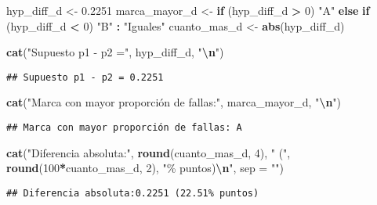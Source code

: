 \documentclass[
]{article}
\newenvironment{Shaded}{\begin{snugshade}}{\end{snugshade}}
\newcommand{\AttributeTok}[1]{\textcolor[rgb]{0.13,0.29,0.53}{#1}}
\newcommand{\ControlFlowTok}[1]{\textcolor[rgb]{0.13,0.29,0.53}{\textbf{#1}}}
\newcommand{\DecValTok}[1]{\textcolor[rgb]{0.00,0.00,0.81}{#1}}
\newcommand{\FloatTok}[1]{\textcolor[rgb]{0.00,0.00,0.81}{#1}}
\newcommand{\FunctionTok}[1]{\textcolor[rgb]{0.13,0.29,0.53}{\textbf{#1}}}
\newcommand{\NormalTok}[1]{#1}
\newcommand{\OtherTok}[1]{\textcolor[rgb]{0.56,0.35,0.01}{#1}}
\newcommand{\SpecialCharTok}[1]{\textcolor[rgb]{0.81,0.36,0.00}{\textbf{#1}}}
\newcommand{\StringTok}[1]{\textcolor[rgb]{0.31,0.60,0.02}{#1}}
\begin{document}
\begin{Shaded}
\begin{Highlighting}[]
\NormalTok{hyp\_diff\_d }\OtherTok{\textless{}{-}} \FloatTok{0.2251}
\NormalTok{marca\_mayor\_d }\OtherTok{\textless{}{-}} \ControlFlowTok{if}\NormalTok{ (hyp\_diff\_d }\SpecialCharTok{\textgreater{}} \DecValTok{0}\NormalTok{) }\StringTok{"A"} \ControlFlowTok{else} \ControlFlowTok{if}\NormalTok{ (hyp\_diff\_d }\SpecialCharTok{\textless{}} \DecValTok{0}\NormalTok{) }\StringTok{"B"} \SpecialCharTok{:} \StringTok{"Iguales"}
\NormalTok{cuanto\_mas\_d }\OtherTok{\textless{}{-}} \FunctionTok{abs}\NormalTok{(hyp\_diff\_d)}

\FunctionTok{cat}\NormalTok{(}\StringTok{"Supuesto p1 {-} p2 ="}\NormalTok{, hyp\_diff\_d, }\StringTok{"}\SpecialCharTok{\textbackslash{}n}\StringTok{"}\NormalTok{)}
\end{Highlighting}
\end{Shaded}

\begin{verbatim}
## Supuesto p1 - p2 = 0.2251
\end{verbatim}

\begin{Shaded}
\begin{Highlighting}[]
\FunctionTok{cat}\NormalTok{(}\StringTok{"Marca con mayor proporción de fallas:"}\NormalTok{, marca\_mayor\_d, }\StringTok{"}\SpecialCharTok{\textbackslash{}n}\StringTok{"}\NormalTok{)}
\end{Highlighting}
\end{Shaded}

\begin{verbatim}
## Marca con mayor proporción de fallas: A
\end{verbatim}

\begin{Shaded}
\begin{Highlighting}[]
\FunctionTok{cat}\NormalTok{(}\StringTok{"Diferencia absoluta:"}\NormalTok{, }\FunctionTok{round}\NormalTok{(cuanto\_mas\_d, }\DecValTok{4}\NormalTok{), }\StringTok{" ("}\NormalTok{, }\FunctionTok{round}\NormalTok{(}\DecValTok{100}\SpecialCharTok{*}\NormalTok{cuanto\_mas\_d, }\DecValTok{2}\NormalTok{), }\StringTok{"\% puntos)}\SpecialCharTok{\textbackslash{}n}\StringTok{"}\NormalTok{, }\AttributeTok{sep =} \StringTok{""}\NormalTok{)}
\end{Highlighting}
\end{Shaded}

\begin{verbatim}
## Diferencia absoluta:0.2251 (22.51% puntos)
\end{verbatim}
\end{document}
